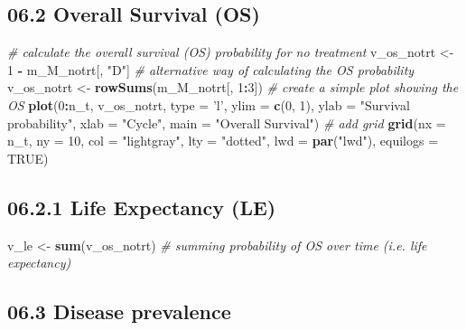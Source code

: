 \documentclass[]{article}
\newenvironment{Shaded}{\begin{snugshade}}{\end{snugshade}}
\newcommand{\KeywordTok}[1]{\textcolor[rgb]{0.13,0.29,0.53}{\textbf{#1}}}
\newcommand{\DataTypeTok}[1]{\textcolor[rgb]{0.13,0.29,0.53}{#1}}
\newcommand{\DecValTok}[1]{\textcolor[rgb]{0.00,0.00,0.81}{#1}}
\newcommand{\StringTok}[1]{\textcolor[rgb]{0.31,0.60,0.02}{#1}}
\newcommand{\CommentTok}[1]{\textcolor[rgb]{0.56,0.35,0.01}{\textit{#1}}}
\newcommand{\OtherTok}[1]{\textcolor[rgb]{0.56,0.35,0.01}{#1}}
\newcommand{\OperatorTok}[1]{\textcolor[rgb]{0.81,0.36,0.00}{\textbf{#1}}}
\newcommand{\NormalTok}[1]{#1}
\begin{document}
\subsection{06.2 Overall Survival (OS)}\label{overall-survival-os}

\begin{Shaded}
\begin{Highlighting}[]
\CommentTok{# calculate the overall survival (OS) probability for no treatment}
\NormalTok{v_os_notrt <-}\StringTok{ }\DecValTok{1} \OperatorTok{-}\StringTok{ }\NormalTok{m_M_notrt[, }\StringTok{"D"}\NormalTok{]    }
\CommentTok{# alternative way of calculating the OS probability   }
\NormalTok{v_os_notrt <-}\StringTok{ }\KeywordTok{rowSums}\NormalTok{(m_M_notrt[, }\DecValTok{1}\OperatorTok{:}\DecValTok{3}\NormalTok{])  }
\CommentTok{# create a simple plot showing the OS}
\KeywordTok{plot}\NormalTok{(}\DecValTok{0}\OperatorTok{:}\NormalTok{n_t, v_os_notrt, }\DataTypeTok{type =} \StringTok{'l'}\NormalTok{, }
     \DataTypeTok{ylim =} \KeywordTok{c}\NormalTok{(}\DecValTok{0}\NormalTok{, }\DecValTok{1}\NormalTok{),}
     \DataTypeTok{ylab =} \StringTok{"Survival probability"}\NormalTok{,}
     \DataTypeTok{xlab =} \StringTok{"Cycle"}\NormalTok{,}
     \DataTypeTok{main =} \StringTok{"Overall Survival"}\NormalTok{)          }
\CommentTok{# add grid }
\KeywordTok{grid}\NormalTok{(}\DataTypeTok{nx =}\NormalTok{ n_t, }\DataTypeTok{ny =} \DecValTok{10}\NormalTok{, }\DataTypeTok{col =} \StringTok{"lightgray"}\NormalTok{, }\DataTypeTok{lty =} \StringTok{"dotted"}\NormalTok{, }\DataTypeTok{lwd =} \KeywordTok{par}\NormalTok{(}\StringTok{"lwd"}\NormalTok{), }
     \DataTypeTok{equilogs =} \OtherTok{TRUE}\NormalTok{) }
\end{Highlighting}
\end{Shaded}

\subsection{06.2.1 Life Expectancy (LE)}\label{life-expectancy-le}

\begin{Shaded}
\begin{Highlighting}[]
\NormalTok{v_le <-}\StringTok{ }\KeywordTok{sum}\NormalTok{(v_os_notrt)  }\CommentTok{# summing probability of OS over time  (i.e. life expectancy)}
\end{Highlighting}
\end{Shaded}

\subsection{06.3 Disease prevalence}\label{disease-prevalence}
\end{document}
